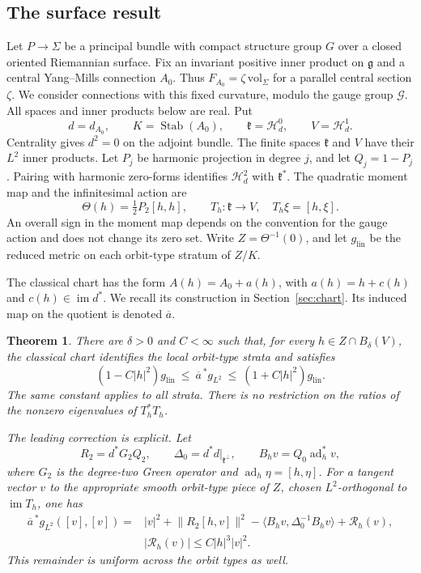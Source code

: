 \documentclass[11pt]{amsart}
\newtheorem{theorem}{Theorem}[section]
\theoremstyle{definition}
\theoremstyle{remark}
\newcommand{\g}{\mathfrak g}
\newcommand{\kk}{\mathfrak k}
\newcommand{\cH}{\mathcal H}
\newcommand{\cG}{\mathcal G}
\newcommand{\ad}{\operatorname{ad}}
\newcommand{\im}{\operatorname{im}}
\newcommand{\Stab}{\operatorname{Stab}}
\newcommand{\ip}[2]{\langle #1,#2\rangle}
\newcommand{\norm}[1]{\lVert #1\rVert}
\begin{document}
\subsection{The surface result}
Let $P\to\Sigma$ be a principal bundle with compact structure group $G$
over a closed oriented Riemannian surface. Fix an invariant positive
inner product on $\g$ and a central Yang--Mills connection $A_0$.
Thus $F_{A_0}=\zeta\,\mathrm{vol}_\Sigma$ for a parallel central
section $\zeta$. We consider connections with this fixed curvature,
modulo the gauge group $\cG$. All spaces and inner products
below are real. Put
\[
 d=d_{A_0},\qquad K=\Stab(A_0),\qquad
 \kk=\cH^0_d,\qquad V=\cH^1_d.
\]
Centrality gives $d^2=0$ on the adjoint bundle. The finite spaces
$\kk$ and $V$ have their $L^2$ inner products. Let $P_j$ be harmonic
projection in degree $j$, and let $Q_j=1-P_j$. Pairing with harmonic
zero-forms identifies $\cH^2_d$ with $\kk^*$. The quadratic moment map
and the infinitesimal action are
\begin{equation}\label{eq:intromodel}
 \Theta(h)=\tfrac12P_2[h,h],\qquad
 T_h:\kk\longrightarrow V,\quad T_h\xi=[h,\xi].
\end{equation}
An overall sign in the moment map depends on the convention for the
gauge action and does not change its zero set. Write $Z=\Theta^{-1}(0)$,
and let $g_{\mathrm{lin}}$ be the reduced metric on each orbit-type
stratum of $Z/K$.

The classical chart has the form $A(h)=A_0+a(h)$, with
$a(h)=h+c(h)$ and $c(h)\in\im d^*$. We recall its construction in
Section~\ref{sec:chart}. Its induced map on the quotient is denoted
$\overline a$.

\begin{theorem}\label{thm:metric}
There are $\delta>0$ and $C<\infty$ such that, for every
$h\in Z\cap B_\delta(V)$, the classical chart identifies the local
orbit-type strata and satisfies
\begin{equation}\label{eq:metricbound}
 (1-C|h|^2)g_{\mathrm{lin}}
 \ \leq\ \overline a^{\,*}g_{L^2}
 \ \leq\ (1+C|h|^2)g_{\mathrm{lin}}.
\end{equation}
The same constant applies to all strata. There is no restriction on
the ratios of the nonzero eigenvalues of $T_h^*T_h$.

The leading correction is explicit. Let
\[
 R_2=d^*G_2Q_2,\qquad
 \Delta_0=d^*d|_{\kk^\perp},\qquad
 B_hv=Q_0\ad_h^*v,
\]
where $G_2$ is the degree-two Green operator and
$\ad_h\eta=[h,\eta]$. For a tangent vector $v$ to the appropriate
smooth orbit-type piece of $Z$, chosen $L^2$-orthogonal to
$\im T_h$, one has
\begin{equation}\label{eq:metricexpansion}
 \begin{split}
 \overline a^{\,*}g_{L^2}([v],[v])
 ={}&|v|^2+\norm{R_2[h,v]}^2
       -\ip{B_hv}{\Delta_0^{-1}B_hv}+\mathcal R_h(v),\\
 &|\mathcal R_h(v)|\leq C|h|^3|v|^2.
 \end{split}
\end{equation}
This remainder is uniform across the orbit types as well.
\end{theorem}
\end{document}
